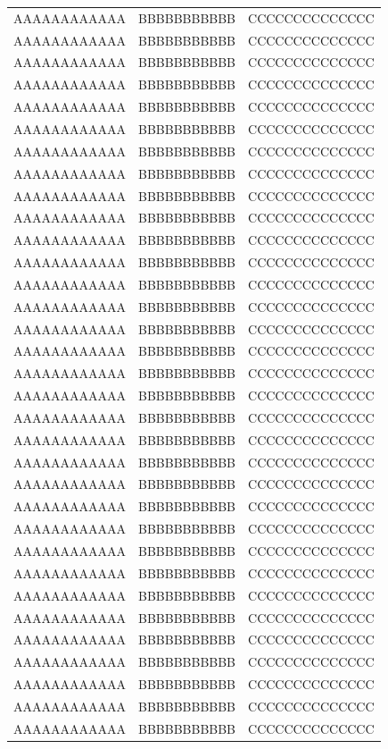 \begin{longtable}[h]{ccc}
  AAAAAAAAAAAA   &   BBBBBBBBBBB   &   CCCCCCCCCCCCCC   \\
  AAAAAAAAAAAA   &   BBBBBBBBBBB   &   CCCCCCCCCCCCCC   \\
  AAAAAAAAAAAA   &   BBBBBBBBBBB   &   CCCCCCCCCCCCCC   \\
  AAAAAAAAAAAA   &   BBBBBBBBBBB   &   CCCCCCCCCCCCCC   \\
  AAAAAAAAAAAA   &   BBBBBBBBBBB   &   CCCCCCCCCCCCCC   \\
  AAAAAAAAAAAA   &   BBBBBBBBBBB   &   CCCCCCCCCCCCCC   \\
  AAAAAAAAAAAA   &   BBBBBBBBBBB   &   CCCCCCCCCCCCCC   \\
  AAAAAAAAAAAA   &   BBBBBBBBBBB   &   CCCCCCCCCCCCCC   \\
  AAAAAAAAAAAA   &   BBBBBBBBBBB   &   CCCCCCCCCCCCCC   \\
  AAAAAAAAAAAA   &   BBBBBBBBBBB   &   CCCCCCCCCCCCCC   \\
  AAAAAAAAAAAA   &   BBBBBBBBBBB   &   CCCCCCCCCCCCCC   \\
  AAAAAAAAAAAA   &   BBBBBBBBBBB   &   CCCCCCCCCCCCCC   \\
  AAAAAAAAAAAA   &   BBBBBBBBBBB   &   CCCCCCCCCCCCCC   \\
  AAAAAAAAAAAA   &   BBBBBBBBBBB   &   CCCCCCCCCCCCCC   \\
  AAAAAAAAAAAA   &   BBBBBBBBBBB   &   CCCCCCCCCCCCCC   \\
  AAAAAAAAAAAA   &   BBBBBBBBBBB   &   CCCCCCCCCCCCCC   \\
  AAAAAAAAAAAA   &   BBBBBBBBBBB   &   CCCCCCCCCCCCCC   \\
  AAAAAAAAAAAA   &   BBBBBBBBBBB   &   CCCCCCCCCCCCCC   \\
  AAAAAAAAAAAA   &   BBBBBBBBBBB   &   CCCCCCCCCCCCCC   \\
  AAAAAAAAAAAA   &   BBBBBBBBBBB   &   CCCCCCCCCCCCCC   \\
  AAAAAAAAAAAA   &   BBBBBBBBBBB   &   CCCCCCCCCCCCCC   \\
  AAAAAAAAAAAA   &   BBBBBBBBBBB   &   CCCCCCCCCCCCCC   \\
  AAAAAAAAAAAA   &   BBBBBBBBBBB   &   CCCCCCCCCCCCCC   \\
  AAAAAAAAAAAA   &   BBBBBBBBBBB   &   CCCCCCCCCCCCCC   \\
  AAAAAAAAAAAA   &   BBBBBBBBBBB   &   CCCCCCCCCCCCCC   \\
  AAAAAAAAAAAA   &   BBBBBBBBBBB   &   CCCCCCCCCCCCCC   \\
  AAAAAAAAAAAA   &   BBBBBBBBBBB   &   CCCCCCCCCCCCCC   \\
  AAAAAAAAAAAA   &   BBBBBBBBBBB   &   CCCCCCCCCCCCCC   \\
  AAAAAAAAAAAA   &   BBBBBBBBBBB   &   CCCCCCCCCCCCCC   \\
  AAAAAAAAAAAA   &   BBBBBBBBBBB   &   CCCCCCCCCCCCCC   \\
  AAAAAAAAAAAA   &   BBBBBBBBBBB   &   CCCCCCCCCCCCCC   \\
  AAAAAAAAAAAA   &   BBBBBBBBBBB   &   CCCCCCCCCCCCCC   \\
  AAAAAAAAAAAA   &   BBBBBBBBBBB   &   CCCCCCCCCCCCCC   \\
\end{longtable}

